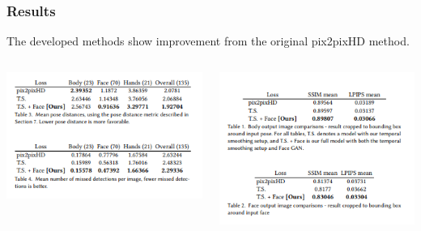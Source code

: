 \documentclass{beamer}
\begin{document}
\begin{frame}
        \frametitle{Results}
        The developed methods show improvement from the original pix2pixHD method. \\
        \begin{columns}
            \begin{column}{0.4\textwidth}
                \includegraphics[scale=.8]{images/results2.png}
            \end{column}
            \begin{column}{0.6\textwidth}
                \includegraphics[scale=.8]{images/results1.png}
                \begin{center}
                \end{center}
            \end{column}
        \end{columns}
    \end{frame}
\end{document}

